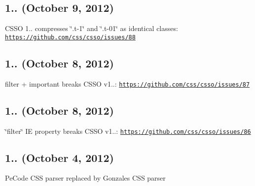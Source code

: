 \subsection*{1.. (October 9, 2012)}


\begin{DoxyItemize}
\item C\+S\+SO 1.. compresses \char`\"{}.\+t-\/1\char`\"{} and \char`\"{}.\+t-\/01\char`\"{} as identical classes\+: \href{https://github.com/css/csso/issues/88}{\tt https\+://github.\+com/css/csso/issues/88}
\end{DoxyItemize}

\subsection*{1.. (October 8, 2012)}


\begin{DoxyItemize}
\item filter + important breaks C\+S\+SO v1..\+: \href{https://github.com/css/csso/issues/87}{\tt https\+://github.\+com/css/csso/issues/87}
\end{DoxyItemize}

\subsection*{1.. (October 8, 2012)}


\begin{DoxyItemize}
\item \char`\"{}filter\char`\"{} IE property breaks C\+S\+SO v1..\+: \href{https://github.com/css/csso/issues/86}{\tt https\+://github.\+com/css/csso/issues/86}
\end{DoxyItemize}

\subsection*{1.. (October 4, 2012)}


\begin{DoxyItemize}
\item Pe\+Code C\+SS parser replaced by Gonzales C\+SS parser 
\end{DoxyItemize}